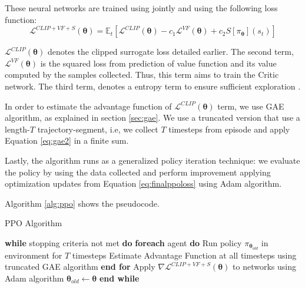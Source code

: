 These neural networks are trained using jointly and using the following loss function:
\begin{equation} \label{eq:finalppoloss}
\mathcal{L}^{CLIP + VF + S}(\boldsymbol{\theta}) = \mathbb{E}_{t}[\mathcal{L}^{CLIP}(\boldsymbol{\theta}) - c_{1} \mathcal{L}^{VF}(\boldsymbol{\theta}) + c_{2}S[\pi_{\boldsymbol{\theta}}](s_{t})]
\end{equation}

$\mathcal{L}^{CLIP}(\boldsymbol{\theta})$ denotes the clipped surrogate loss detailed earlier. The second term,  $\mathcal{L}^{VF}(\boldsymbol{\theta})$ is the squared loss from prediction of value function and its value computed by the samples collected. Thus, this term aims to train the Critic network. The third term, denotes a entropy term to ensure sufficient exploration \cite{a2c}.

In order to estimate the advantage function of $\mathcal{L}^{CLIP}(\boldsymbol{\theta})$ term, we use GAE algorithm, as explained in section \ref{sec:gae}. We use a truncated version that use a length-$T$ trajectory-segment, i.e, we collect $T$ timesteps from episode and apply Equation \ref{eq:gae2} in a finite sum.

Lastly, the algorithm runs as a generalized policy iteration technique: we evaluate the policy by using the data collected and perform improvement applying optimization updates from Equation \ref{eq:finalppoloss} using Adam algorithm.

Algorithm \ref{alg:ppo} shows the pseudocode.


\begin{algorithm}[!htbp]
	\caption{PPO Algorithm}
	\begin{algorithmic}
		\STATE \textbf{while} stopping criteria not met \textbf{do}
		\STATE \hspace{5mm}\textbf{foreach} agent \textbf{do}
		\STATE \hspace{10mm} Run policy $\pi_{\boldsymbol{\theta}_{old}}$ in environment for $T$ timesteps
		\STATE \hspace{10mm} Estimate Advantage Function at all timesteps using truncated GAE algorithm
		\STATE \hspace{5mm} \textbf{end for}
		\STATE \hspace{5mm}Apply $  \nabla\mathcal{L}^{CLIP + VF + S}(\boldsymbol{\theta})$ to networks using Adam algorithm
		\STATE \hspace{5mm} $\boldsymbol{\theta}_{old} \leftarrow \boldsymbol{\theta}$
		\STATE \textbf{end while}
	\end{algorithmic}
	\label{alg:ppo}
\end{algorithm}